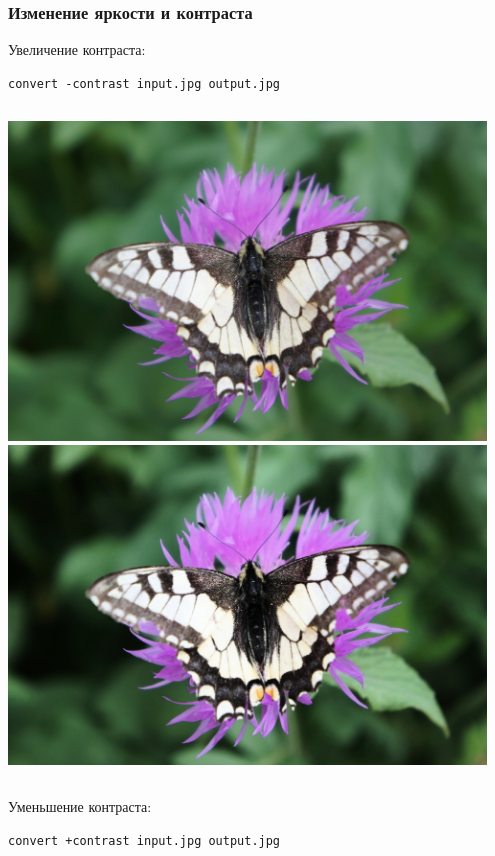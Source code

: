 \documentclass[11pt, compress]{beamer}
\begin{document}
\begin{frame}[c, fragile]
\frametitle{Изменение яркости и контраста}
Увеличение контраста:
\begin{lstlisting}
convert -contrast input.jpg output.jpg
\end{lstlisting}
\begin{columns}
\center
\includegraphics[width=0.95\textwidth]{FLY1000.jpg}
\center
\includegraphics[width=0.95\textwidth]{FLY_contrast.jpg}
\end{columns}
\vfill
Уменьшение контраста:
\begin{lstlisting}
convert +contrast input.jpg output.jpg
\end{lstlisting}
\end{frame}
\end{document}

